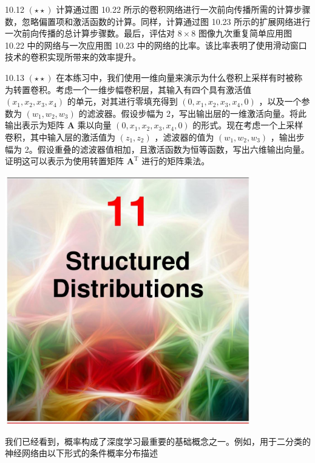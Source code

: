 \documentclass[10pt]{report}
\begin{document}
10.12 \(\left( {\star  \star  }\right)\) 计算通过图 10.22 所示的卷积网络进行一次前向传播所需的计算步骤数，忽略偏置项和激活函数的计算。同样，计算通过图 10.23 所示的扩展网络进行一次前向传播的总计算步骤数。最后，评估对 \(8 \times  8\) 图像九次重复简单应用图 10.22 中的网络与一次应用图 10.23 中的网络的比率。该比率表明了使用滑动窗口技术的卷积实现所带来的效率提升。

10.13 \(\left( {\star  \star  }\right)\) 在本练习中，我们使用一维向量来演示为什么卷积上采样有时被称为转置卷积。考虑一个一维步幅卷积层，其输入有四个具有激活值 \(\left( {{x}_{1},{x}_{2},{x}_{3},{x}_{4}}\right)\) 的单元，对其进行零填充得到 \(\left( {0,{x}_{1},{x}_{2},{x}_{3},{x}_{4},0}\right)\) ，以及一个参数为 \(\left( {{w}_{1},{w}_{2},{w}_{3}}\right)\) 的滤波器。假设步幅为 2，写出输出层的一维激活向量。将此输出表示为矩阵 \(\mathbf{A}\) 乘以向量 \(\left( {0,{x}_{1},{x}_{2},{x}_{3},{x}_{4},0}\right)\) 的形式。现在考虑一个上采样卷积，其中输入层的激活值为 \(\left( {{z}_{1},{z}_{2}}\right)\) ，滤波器的值为 \(\left( {{w}_{1},{w}_{2},{w}_{3}}\right)\) ，输出步幅为 2。假设重叠的滤波器值相加，且激活函数为恒等函数，写出六维输出向量。证明这可以表示为使用转置矩阵 \({\mathbf{A}}^{\mathrm{T}}\) 进行的矩阵乘法。

\begin{center}
\includegraphics[max width=0.8\textwidth]{images/0194e279-9b28-703a-88f4-c3ac21e2010d_344_472_349_1076_1089_0.jpg}
\end{center}
\hspace*{3em} 

我们已经看到，概率构成了深度学习最重要的基础概念之一。例如，用于二分类的神经网络由以下形式的条件概率分布描述
\end{document}
